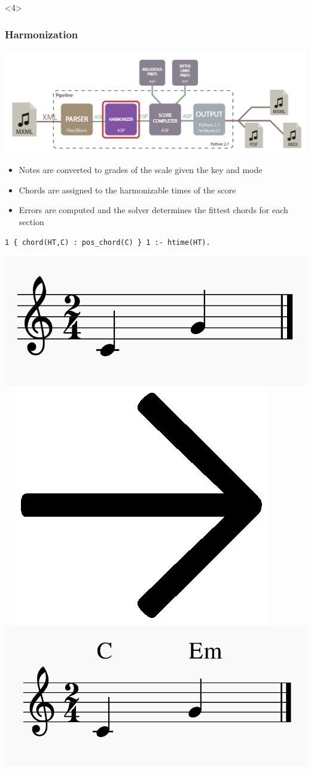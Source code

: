 \documentclass[english,handout]{beamer}
\begin{document}
\begin{frame}[fragile]
			<4>
	\end{frame}
	\begin{frame}[t,fragile]
	\frametitle{Harmonization}
	\begin{center}
			\includegraphics[width=0.6\linewidth]{imagenes/arch_trans/arquitectura_final_asp_harm-01.png}
	\end{center}
	\begin{itemize}
		\item Notes are converted to \alert{grades of the scale} given the \alert{key} and \alert{mode}
		\item \alert{Chords} are assigned to the harmonizable times of the score
		\item \alert{Errors} are computed and the solver determines the \alert{fittest chords} for each section
	\end{itemize}
	\pause
	\begin{Verbatim}[frame=single]
    1 { chord(HT,C) : pos_chord(C) } 1 :- htime(HT).
	\end{Verbatim}
	\begin{center}
			\includegraphics[width=0.25\linewidth,valign=c]{imagenes/example_notes.png}~~
			\includegraphics[width=0.04\linewidth,valign=c]{imagenes/arrow.png}~~
			\includegraphics[width=0.25\linewidth,valign=c]{imagenes/harmonized_example.png}
	\end{center}

	\end{frame}
\end{document}
